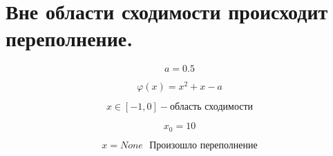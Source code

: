 \documentclass[11pt]{article}
\begin{document}
    \hypertarget{ux432ux43dux435-ux43eux431ux43bux430ux441ux442ux438-ux441ux445ux43eux434ux438ux43cux43eux441ux442ux438-ux43fux440ux43eux438ux441ux445ux43eux434ux438ux442-ux43fux435ux440ux435ux43fux43eux43bux43dux435ux43dux438ux435.}{%
\section{Вне области сходимости происходит
переполнение.}\label{ux432ux43dux435-ux43eux431ux43bux430ux441ux442ux438-ux441ux445ux43eux434ux438ux43cux43eux441ux442ux438-ux43fux440ux43eux438ux441ux445ux43eux434ux438ux442-ux43fux435ux440ux435ux43fux43eux43bux43dux435ux43dux438ux435.}}

\[
a = 0.5
\]

\[
\varphi(x) = x^{2} + x - a
\]

\[
x \in [-1, 0] - \text{область сходимости}
\]

\[
x_{0} = 10
\]

\[
x = None \ \ \ \text{Произошло переполнение}
\]
\end{document}
